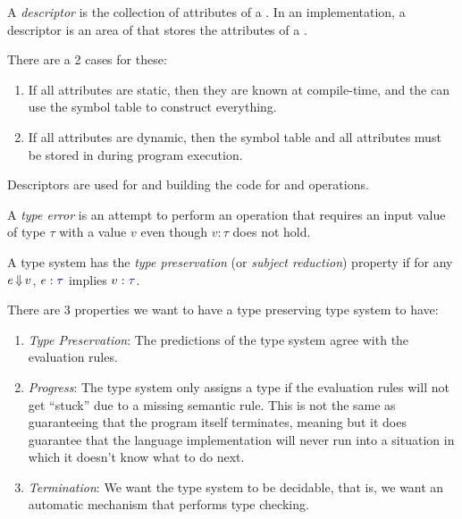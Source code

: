 \begin{definition}[Descriptor]\label{def:Descriptor}
  A \emph{descriptor} is the collection of attributes of a .
  In an implementation, a descriptor is an area of  that stores the attributes of a .
  
  There are a 2 cases for these:
  \begin{enumerate}[noitemsep]
  \item If all attributes are static, then they are known at compile-time, and the  can use the symbol table to construct everything.
  \item If all attributes are dynamic, then the symbol table and all attributes must be stored in  during program execution.
  \end{enumerate}

  Descriptors are used for  and building the code for  and  operations.
\end{definition}

\begin{definition}\label{def:Type_Error}
  A \emph{type error} is an attempt to perform an operation that requires an input value of type $\tau$ with a value $v$ even though $v : \tau$ does not hold.
\end{definition}

\begin{definition}\label{def:Type_Preservation}
  A type system has the \emph{type preservation} (or \emph{subject reduction}) property if for any $e \operatorname{\Downarrow} v$, $e : \DataType$ implies $v : \DataType$.

  There are 3 properties we want to have a type preserving type system to have:
  \begin{enumerate}[noitemsep]
  \item \emph{Type Preservation}: The predictions of the type system agree with the evaluation rules.
  \item \emph{Progress}: The type system only assigns a type if the evaluation rules will not get ``stuck'' due to a missing semantic rule. This is not the same as guaranteeing that the program itself terminates, meaning but it does guarantee that the language implementation will never run into a situation in which it doesn't know what to do next.
  \item \emph{Termination}: We want the type system to be decidable, that is, we want an automatic mechanism that performs type checking.
  \end{enumerate}
\end{definition}

